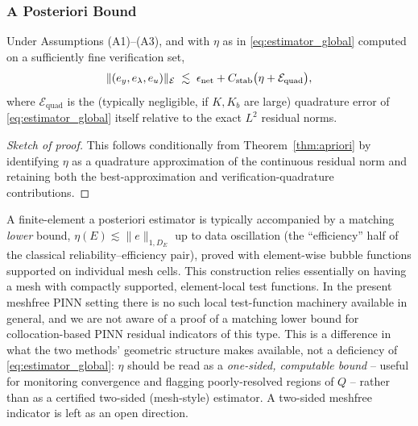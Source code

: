 \subsubsection{A Posteriori Bound}
\label{sec:bound-theorem}

\begin{theorem}
\label{thm:aposteriori}
Under Assumptions (A1)--(A3), and with $\eta$ as in \eqref{eq:estimator_global} computed on a sufficiently fine verification set,
\begin{equation}
\| (e_y, e_\lambda, e_u) \|_{\mathcal{E}} \;\lesssim\; \epsilon_{\rm net}+C_{\rm stab}\bigl(\eta + \mathcal{E}_{\text{quad}}\bigr),
\end{equation}
where $\mathcal{E}_{\text{quad}}$ is the (typically negligible, if $K,K_b$ are large) quadrature error of \eqref{eq:estimator_global} itself relative to the exact $L^2$ residual norms.
\end{theorem}

\begin{proof}[Sketch of proof]
This follows conditionally from Theorem~\ref{thm:apriori} by identifying $\eta$ as a quadrature approximation of the continuous residual norm and retaining both the best-approximation and verification-quadrature contributions.
\end{proof}

\begin{remark}
\label{rem:fem-contrast}
A finite-element a posteriori estimator is typically accompanied by a matching \emph{lower} bound, $\eta(E) \lesssim \|e\|_{1,D_E}$ up to data oscillation (the ``efficiency'' half of the classical reliability--efficiency pair), proved with element-wise bubble functions supported on individual mesh cells. This construction relies essentially on having a mesh with compactly supported, element-local test functions. In the present meshfree PINN setting there is no such local test-function machinery available in general, and we are not aware of a proof of a matching lower bound for collocation-based PINN residual indicators of this type. This is a difference in what the two methods' geometric structure makes available, not a deficiency of \eqref{eq:estimator_global}: $\eta$ should be read as a \emph{one-sided, computable bound} -- useful for monitoring convergence and flagging poorly-resolved regions of $Q$ -- rather than as a certified two-sided (mesh-style) estimator. A two-sided meshfree indicator is left as an open direction.
\end{remark}

